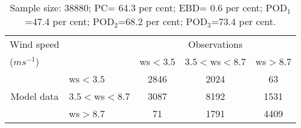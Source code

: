 \documentclass[11pt,english]{article}
\begin{document}
\begin{table}[tbp]
\begin{center}
\begin{tabular}{llccc}
\hline
{Wind speed}                                       &                                                    & \multicolumn{3}{c}{Observations}                 \\
{($m s^{-1}$)}                                       &                             & ws$<3.5$   & $3.5<$ws$<8.7$ & ws$>8.7$ \\
\hline
\multicolumn{1}{c}{\multirow{3}{*}{Model data}}  & ws$<3.5$          & 2846                & 2024                       & 63              \\
                                                 & $3.5<$ws$<8.7$ & 3087                & 8192                       & 1531              \\
                                                 & ws$>8.7$          & 71                & 1791                       & 4409              \\
\hline
\end{tabular}
\end{center}
\caption{Sample size:        38880; PC= 64.3 per cent; EBD= 0.6 per cent; POD$_1$=47.4 per cent; POD$_2$=68.2 per cent; POD$_3$=73.4 per cent.}\label{tab:contingency}
\end{table}
\newpage
\end{document}
